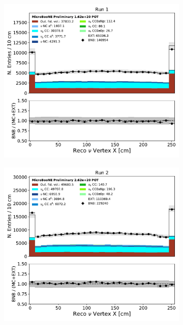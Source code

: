 \begin{figure}[hbt!] 
\begin{center}
    \begin{subfigure}[b]{0.35\textwidth}
        \centering
        \includegraphics[width=1.00\textwidth]{NuMuCCsel/Images/Ryan/Run1/reco_nu_vtx_sce_x_08062020_samples_longest_noCRT_event_category.pdf}
    \end{subfigure}
    \begin{subfigure}[b]{0.35\textwidth}
        \centering
        \includegraphics[width=1.00\textwidth]{NuMuCCsel/Images/Ryan/Run2/reco_nu_vtx_sce_x_08062020_samples_longest_noCRT_event_category.pdf}

\end{subfigure}
\end{center}
\end{figure}
